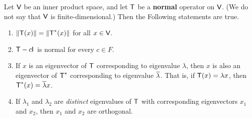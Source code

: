 \begin{theorem} \label{thm 6.15}
Let \(\textsf{V}\) be an inner product space, and let \(\textsf{T}\) be a \textbf{normal} operator on \(\textsf{V}\).
(We do not say that \(\textsf{V}\) is finite-dimensional.)
Then the Following statements are true.
\begin{enumerate}
\item \(\left\lVert\textsf{T}(x)\right\rVert = \left\lVert\textsf{T}^*(x)\right\rVert\) for all \(x \in \textsf{V}\).
\item \(\textsf{T} - c\textsf{I}_{_{}}\) is normal for every \(c \in F\).
\item If \(x\) is an eigenvector of \(\textsf{T}\) corresponding to eigenvalue \(\lambda\), then \(x\) is also an eigenvector of \(\textsf{T}^*\) corresponding to eigenvalue \(\overline{\lambda}\).
That is, if \(\textsf{T}(x) = \lambda x\), then \(\textsf{T}^*(x) = \overline{\lambda}x\).
\item If \(\lambda_1\) and \(\lambda_2\) are \emph{distinct} eigenvalues of \(\textsf{T}\) with corresponding eigenvectors \(x_1\) and \(x_2\), then \(x_1\) and \(x_2\) are orthogonal.
\end{enumerate}
\end{theorem}

